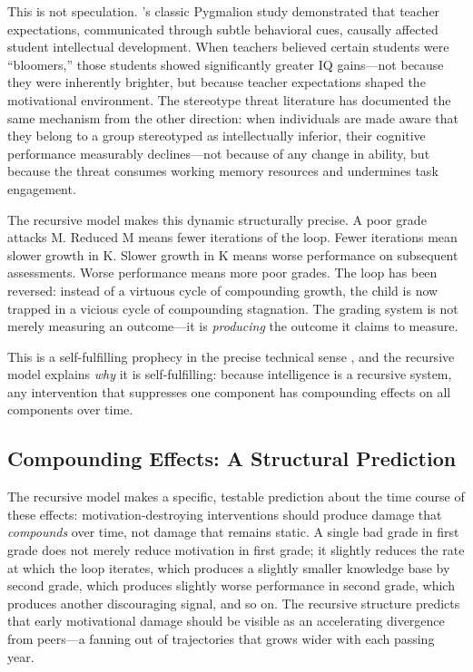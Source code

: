\documentclass[12pt,a4paper]{article}
\begin{document}
This is not speculation. \citeauthor{RosenthalJacobson1968}'s \citeyearpar{RosenthalJacobson1968} classic Pygmalion study demonstrated that teacher expectations, communicated through subtle behavioral cues, causally affected student intellectual development. When teachers believed certain students were ``bloomers,'' those students showed significantly greater IQ gains---\hspace{0pt}not because they were inherently brighter, but because teacher expectations shaped the motivational environment. The stereotype threat literature \citep{SteeleAronson1995} has documented the same mechanism from the other direction: when individuals are made aware that they belong to a group stereotyped as intellectually inferior, their cognitive performance measurably declines---\hspace{0pt}not because of any change in ability, but because the threat consumes working memory resources and undermines task engagement.

The recursive model makes this dynamic structurally precise. A poor grade attacks M. Reduced M means fewer iterations of the loop. Fewer iterations mean slower growth in K. Slower growth in K means worse performance on subsequent assessments. Worse performance means more poor grades. The loop has been reversed: instead of a virtuous cycle of compounding growth, the child is now trapped in a vicious cycle of compounding stagnation. The grading system is not merely measuring an outcome---\hspace{0pt}it is \emph{producing} the outcome it claims to measure.

This is a self-fulfilling prophecy in the precise technical sense \citep{Merton1948}, and the recursive model explains \emph{why} it is self-fulfilling: because intelligence is a recursive system, any intervention that suppresses one component has compounding effects on all components over time.

\subsection{Compounding Effects: A Structural Prediction}

The recursive model makes a specific, testable prediction about the time course of these effects: motivation-destroying interventions should produce damage that \emph{compounds} over time, not damage that remains static. A single bad grade in first grade does not merely reduce motivation in first grade; it slightly reduces the rate at which the loop iterates, which produces a slightly smaller knowledge base by second grade, which produces slightly worse performance in second grade, which produces another discouraging signal, and so on. The recursive structure predicts that early motivational damage should be visible as an accelerating divergence from peers---\hspace{0pt}a fanning out of trajectories that grows wider with each passing year.
\end{document}
